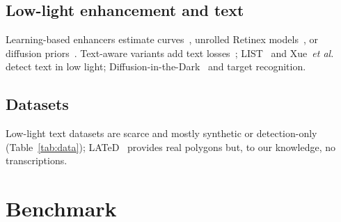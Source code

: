 \documentclass[journal]{IEEEtran}
\begin{document}
\subsection{Low-light enhancement and text}
Learning-based enhancers estimate curves~\cite{guo2020zerodce,li2021zerodcepp,wen2023srdace}, unrolled Retinex models~\cite{liu2021ruas,ma2022sci}, or diffusion priors~\cite{fei2023gdp}. Text-aware variants add text losses~\cite{hsu2022extremely,lin2025textdark}; LIST~\cite{liu2022list} and Xue~\emph{et al.}~\cite{xue2020arbitrarily} detect text in low light; Diffusion-in-the-Dark~\cite{nguyen2024did} and \cite{fu2026reading} target recognition.
\subsection{Datasets}
Low-light text datasets are scarce and mostly synthetic or detection-only (Table~\ref{tab:data}); LATeD~\cite{xu2024seeing} provides real polygons but, to our knowledge, no transcriptions.

\section{Benchmark}
\end{document}
